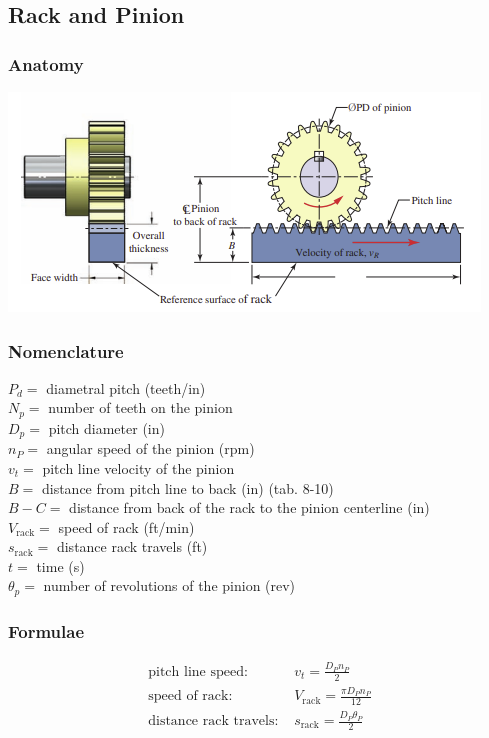 \documentclass[11pt, fleqn]{article}
\begin{document}
\subsection{Rack and Pinion}
\subsubsection{Anatomy}
\includegraphics[scale=1]{Gears/rackAndPinion.png}
\subsubsection{Nomenclature}
$P_d=$ diametral pitch (teeth/in)\\
$N_p=$ number of teeth on the pinion\\
$D_p=$ pitch diameter (in)\\
$n_P=$ angular speed of the pinion (rpm)\\
$v_t=$ pitch line velocity of the pinion\\
$B=$ distance from pitch line to back (in) (tab. 8-10)\\
$B-C=$ distance from back of the rack to the pinion centerline (in)\\
$V_\text{rack}=$ speed of rack (ft/min)\\
$s_\text{rack}=$ distance rack travels (ft)\\
$t=$ time (s)\\
$\theta_p=$ number of revolutions of the pinion (rev)\\
\subsubsection{Formulae}
\begin{align*}
    \text{pitch line speed: }&v_t=\frac{D_Pn_P}{2}\\
    \text{speed of rack: }&V_\text{rack}=\frac{\pi D_P n_P}{12}\\
    \text{distance rack travels: }&s_\text{rack}=\frac{D_P\theta_P}{2}
\end{align*}
\end{document}

